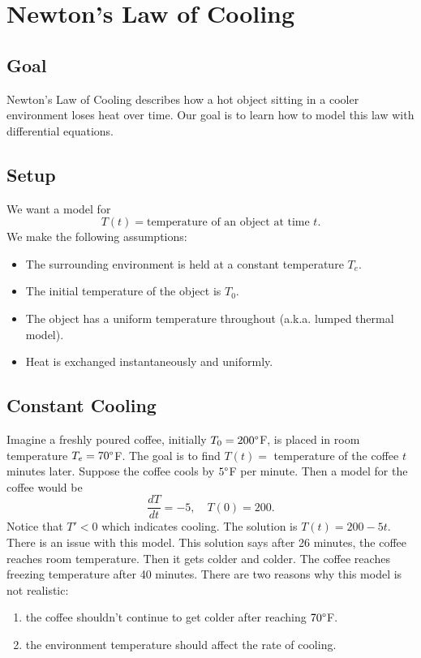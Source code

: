 \documentclass[10pt,letterpaper]{article}
\begin{document}

\section{Newton's Law of Cooling}

\subsection{Goal}
Newton's Law of Cooling describes how a hot object sitting in a cooler environment loses heat over time. Our goal is to learn how to model this law with differential equations. 


\subsection{Setup}
We want a model for 
\[
T(t) = \text{temperature of an object at time } t.
\]
We make the following assumptions:
\begin{itemize}
    \item The surrounding environment is held at a constant temperature $T_e$.
    \item The initial temperature of the object is $T_0$. 
    \item The object has a uniform temperature throughout (a.k.a. lumped thermal model).
    \item Heat is exchanged instantaneously and uniformly.
\end{itemize}

\subsection{Constant Cooling}
Imagine a freshly poured coffee, initially $T_0=200\degree $F, is placed in room temperature $T_e=70\degree $F. The goal is to find $T(t) = $ temperature of the coffee $t$ minutes later. Suppose the coffee cools by $5\degree $F per minute. Then a model for the coffee would be 
$$
    \frac{dT}{dt} = -5, \quad T(0)=200.
$$
Notice that $T'<0$ which indicates cooling. The solution is $T(t)=200-5t$. There is an issue with this model. This solution says after 26 minutes, the coffee reaches room temperature. Then it gets colder and colder. The coffee reaches freezing temperature after 40 minutes. There are two reasons why this model is not realistic:
\begin{enumerate}
    \item the coffee shouldn't continue to get colder after reaching $70\degree $F.
    \item the environment temperature should affect the rate of cooling.
\end{enumerate}
\end{document}
